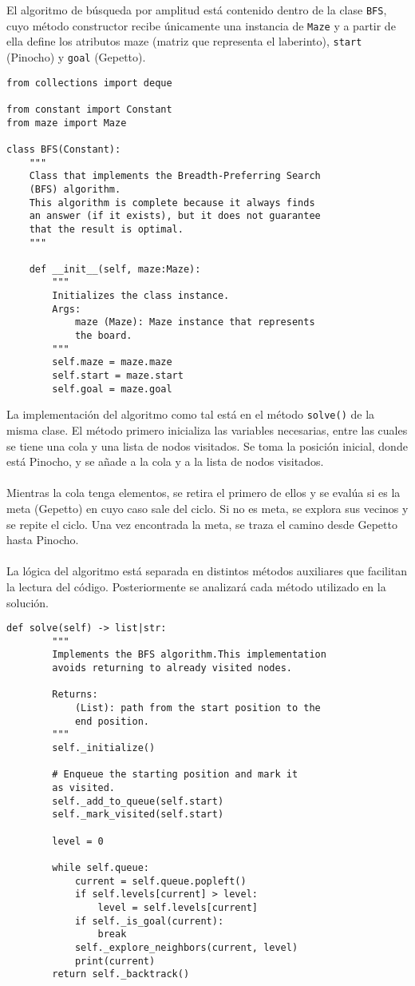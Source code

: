 El algoritmo de búsqueda por amplitud está contenido dentro de la clase \lstinline{BFS}, cuyo método constructor recibe únicamente una instancia de \lstinline{Maze} y a partir de ella define los atributos maze (matriz que representa el laberinto), \lstinline{start} (Pinocho) y \lstinline{goal} (Gepetto).\\
\begin{lstlisting}
from collections import deque

from constant import Constant
from maze import Maze

class BFS(Constant):
    """
    Class that implements the Breadth-Preferring Search
    (BFS) algorithm.
    This algorithm is complete because it always finds
    an answer (if it exists), but it does not guarantee
    that the result is optimal.
    """

    def __init__(self, maze:Maze):
        """
        Initializes the class instance.
        Args:
            maze (Maze): Maze instance that represents
            the board.
        """
        self.maze = maze.maze
        self.start = maze.start
        self.goal = maze.goal
\end{lstlisting}
\clearpage
La implementación del algoritmo como tal está en el método \lstinline{solve()} de la misma clase. El método primero inicializa las variables necesarias, entre las cuales se tiene una cola y una lista de nodos visitados. Se toma la posición inicial, donde está Pinocho, y se añade a la cola y a la lista de nodos visitados.\\\\
Mientras la cola tenga elementos, se retira el primero de ellos y se evalúa si es la meta (Gepetto) en cuyo caso sale del ciclo. Si no es meta, se explora sus vecinos y se repite el ciclo. Una vez encontrada la meta, se traza el camino desde Gepetto hasta Pinocho.\\\\
La lógica del algoritmo está separada en distintos métodos auxiliares que facilitan la lectura del código. Posteriormente se analizará cada método utilizado en la solución.\\
\begin{lstlisting}
def solve(self) -> list|str:
        """
        Implements the BFS algorithm.This implementation
        avoids returning to already visited nodes.

        Returns:
            (List): path from the start position to the 
            end position.
        """
        self._initialize()

        # Enqueue the starting position and mark it 
        as visited.
        self._add_to_queue(self.start)
        self._mark_visited(self.start)

        level = 0

        while self.queue:
            current = self.queue.popleft()
            if self.levels[current] > level:
                level = self.levels[current]
            if self._is_goal(current):
                break
            self._explore_neighbors(current, level)
            print(current)
        return self._backtrack()
\end{lstlisting}
